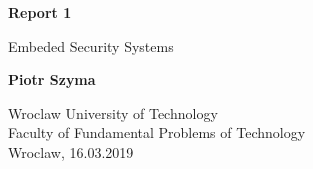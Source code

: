 \begin{titlepage}
  \begin{center}
      \vspace*{1cm}

      \textbf{Report 1}

      \vspace{0.5cm}
       Embeded Security Systems

      \vspace{1.5cm}

      \textbf{Piotr Szyma}

      \vfill

      \vspace{0.8cm}

      Wroclaw University of Technology\\
      Faculty of Fundamental Problems of Technology\\
      Wroclaw, 16.03.2019

  \end{center}
\end{titlepage}